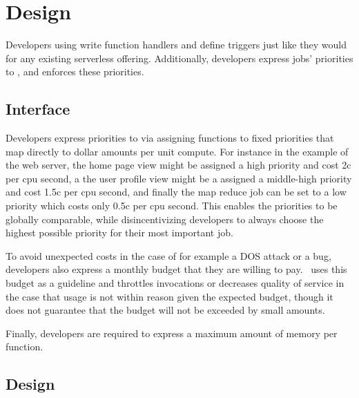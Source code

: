 \section{Design}\label{design}


Developers using \sys{} write function handlers and define triggers just like
they would for any existing serverless offering. Additionally, developers
express jobs' priorities to \sys{}, and \sys{} enforces these priorities.



\subsection{Interface}

Developers express priorities to \sys{} via assigning functions to fixed
priorities that map directly to dollar amounts per unit compute. For instance in
the example of the web server, the home page view might be assigned a high
priority and cost 2c per cpu second, a the user profile view might be a assigned
a middle-high priority and cost 1.5c per cpu second, and finally the map reduce
job can be set to a low priority which costs only 0.5c per cpu second. This
enables the priorities to be globally comparable, while disincentivizing
developers to always choose the highest possible priority for their most
important job.
 
To avoid unexpected costs in the case of for example a DOS attack or a bug,
developers also express a monthly budget that they are willing to pay.\ \sys{}
uses this budget as a guideline and throttles invocations or decreases quality
of service in the case that usage is not within reason given the expected
budget, though it does not guarantee that the budget will not be exceeded by
small amounts.

Finally, developers are required to express a maximum amount of memory per
function.



\subsection{\sys{} Design}

